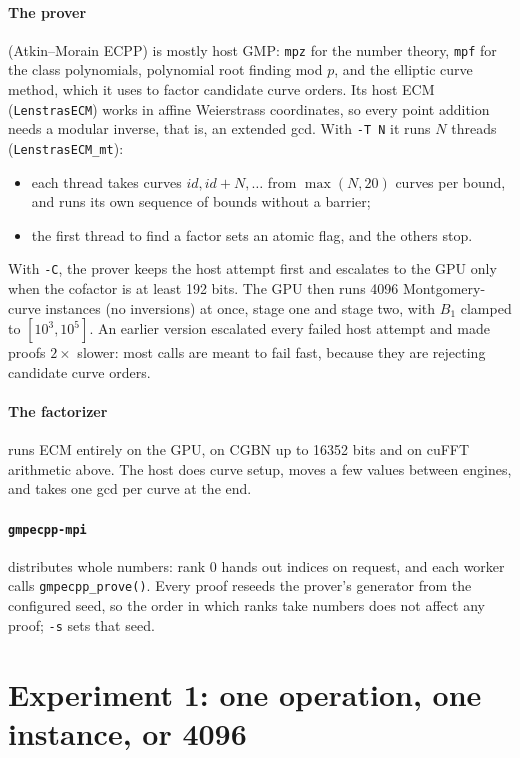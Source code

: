 \documentclass[11pt,a4paper]{article}
\newcommand{\code}[1]{\texttt{#1}}
\begin{document}
\paragraph{The prover} (Atkin--Morain ECPP) is mostly host GMP: \code{mpz}
for the number theory, \code{mpf} for the class polynomials, polynomial
root finding mod $p$, and the elliptic curve method, which it uses to
factor candidate curve orders. Its host ECM (\code{LenstrasECM}) works in
affine Weierstrass coordinates, so every point addition needs a modular
inverse, that is, an extended gcd. With \code{-T N} it runs $N$ threads
(\code{LenstrasECM\_mt}):
\begin{itemize}
  \item each thread takes curves $\mathit{id}, \mathit{id}+N, \ldots$
    from $\max(N, 20)$ curves per bound, and runs its own sequence of
    bounds without a barrier;
  \item the first thread to find a factor sets an atomic flag, and the
    others stop.
\end{itemize}
With \code{-C}, the prover keeps the host attempt first and escalates to
the GPU only when the cofactor is at least 192 bits. The GPU then runs 4096
Montgomery-curve instances (no inversions) at once, stage one and stage
two, with $B_1$ clamped to $[10^3, 10^5]$. An earlier version escalated
every failed host attempt and made proofs $2\times$ slower: most calls are
meant to fail fast, because they are rejecting candidate curve orders.

\paragraph{The factorizer} runs ECM entirely on the GPU, on CGBN up to
16352 bits and on cuFFT arithmetic above. The host does curve setup, moves
a few values between engines, and takes one gcd per curve at the end.

\paragraph{\code{gmpecpp-mpi}} distributes whole numbers: rank 0 hands out
indices on request, and each worker calls \code{gmpecpp\_prove()}. Every
proof reseeds the prover's generator from the configured seed, so the
order in which ranks take numbers does not affect any proof; \code{-s}
sets that seed.

\section{Experiment 1: one operation, one instance, or 4096}
\label{sec:exp1}
\end{document}
